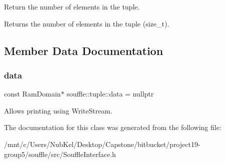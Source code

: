 Return the number of elements in the tuple. \begin{DoxyReturn}{Returns}
the number of elements in the tuple (size\+\_\+t). 
\end{DoxyReturn}


\subsection{Member Data Documentation}
\mbox{\label{classsouffle_1_1tuple_a568f8cdfdd9f6d8a4c638e979a763c13}} 
\subsubsection{\texorpdfstring{data}{data}}
{\footnotesize\ttfamily const Ram\+Domain$\ast$ souffle\+::tuple\+::data = nullptr}

Allows printing using Write\+Stream. 

The documentation for this class was generated from the following file\+:\begin{DoxyCompactItemize}
\item 
/mnt/c/\+Users/\+Nub\+Kel/\+Desktop/\+Capstone/bitbucket/project19-\/group5/souffle/src/Souffle\+Interface.\+h\end{DoxyCompactItemize}
